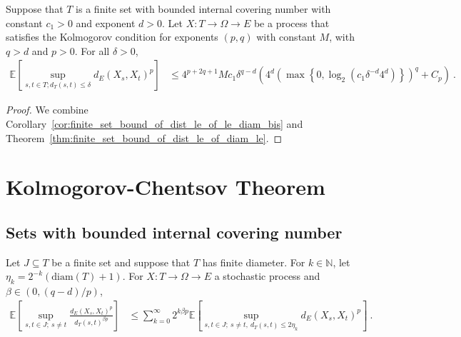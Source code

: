 \begin{corollary}\label{cor:finite_set_bound_of_dist_le}
  \leanok
Suppose that $T$ is a finite set with bounded internal covering number with constant $c_1>0$ and exponent $d > 0$.
Let $X : T \to \Omega \to E$ be a process that satisfies the Kolmogorov condition for exponents $(p,q)$ with constant $M$, with $q > d$ and $p > 0$.
For all $\delta > 0$,
\begin{align*}
  \mathbb{E}\left[ \sup_{s, t \in T; d_T(s, t) \le \delta} d_E(X_s, X_t)^p \right]
  &\le 4^{p+2q+1} M c_1 \delta^{q-d} \left(4^d \left(\max\left\{0, \log_2 \left(c_1 \delta^{-d} 4^d\right) \right\} \right)^q
    + C_p\right)
  \: .
\end{align*}
\end{corollary}


\begin{proof}
We combine Corollary~\ref{cor:finite_set_bound_of_dist_le_of_le_diam_bis} and Theorem~\ref{thm:finite_set_bound_of_dist_le_of_diam_le}.
\end{proof}




\section{Kolmogorov-Chentsov Theorem}


\subsection{Sets with bounded internal covering number}

\begin{lemma}\label{lem:integral_div_dist_le_sum_integral_dist_le}
  \leanok
Let $J \subseteq T$ be a finite set and suppose that $T$ has finite diameter.
For $k \in \mathbb{N}$, let $\eta_k = 2^{-k}(\mathrm{diam}(T) + 1)$.
For $X : T \to \Omega \to E$ a stochastic process and $\beta \in(0, (q - d)/p)$,
\begin{align*}
  \mathbb{E}\left[ \sup_{s, t \in J;\: s \ne t} \frac{d_E(X_s, X_t)^p}{d_T(s, t)^{\beta p}} \right]
  &\le \sum_{k=0}^\infty 2^{k \beta p} \mathbb{E}\left[ \sup_{s, t \in J;\: s \ne t, \: d_T(s, t) \le 2 \eta_k} d_E(X_s, X_t)^p \right]
  \: .
\end{align*}
\end{lemma}

